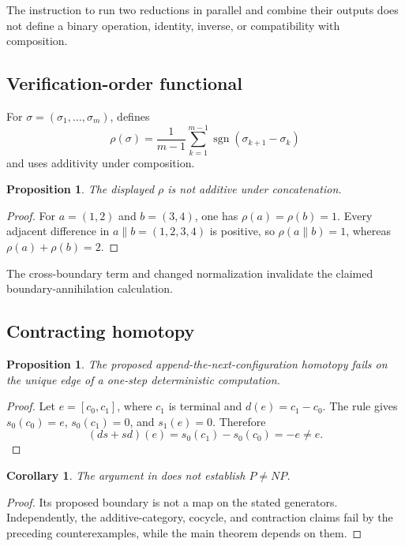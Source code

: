 \documentclass[11pt]{article}
\newtheorem{proposition}[theorem]{Proposition}
\newtheorem{corollary}[theorem]{Corollary}
\theoremstyle{definition}
\begin{document}
The instruction to run two reductions in parallel and combine their outputs
does not define a binary operation, identity, inverse, or compatibility with
composition.

\subsection{Verification-order functional}

For \(\sigma=(\sigma_1,\ldots,\sigma_m)\), \cite{Tang} defines
\[
 \rho(\sigma)=\frac{1}{m-1}
 \sum_{k=1}^{m-1}\operatorname{sgn}(\sigma_{k+1}-\sigma_k)
\]
and uses additivity under composition.

\begin{proposition}
The displayed \(\rho\) is not additive under concatenation.
\end{proposition}

\begin{proof}
For \(a=(1,2)\) and \(b=(3,4)\), one has
\(\rho(a)=\rho(b)=1\). Every adjacent difference in
\(a\|b=(1,2,3,4)\) is positive, so \(\rho(a\|b)=1\), whereas
\(\rho(a)+\rho(b)=2\).
\end{proof}

The cross-boundary term and changed normalization invalidate the claimed
boundary-annihilation calculation.

\subsection{Contracting homotopy}

\begin{proposition}
The proposed append-the-next-configuration homotopy fails on the unique edge
of a one-step deterministic computation.
\end{proposition}

\begin{proof}
Let \(e=[c_0,c_1]\), where \(c_1\) is terminal and
\(d(e)=c_1-c_0\). The rule gives
\(s_0(c_0)=e\), \(s_0(c_1)=0\), and \(s_1(e)=0\). Therefore
\[
 (ds+sd)(e)=s_0(c_1)-s_0(c_0)=-e\ne e.
\]
\end{proof}

\begin{corollary}
The argument in \cite{Tang} does not establish \(P\ne NP\).
\end{corollary}

\begin{proof}
Its proposed boundary is not a map on the stated generators. Independently,
the additive-category, cocycle, and contraction claims fail by the preceding
counterexamples, while the main theorem depends on them.
\end{proof}
\end{document}

